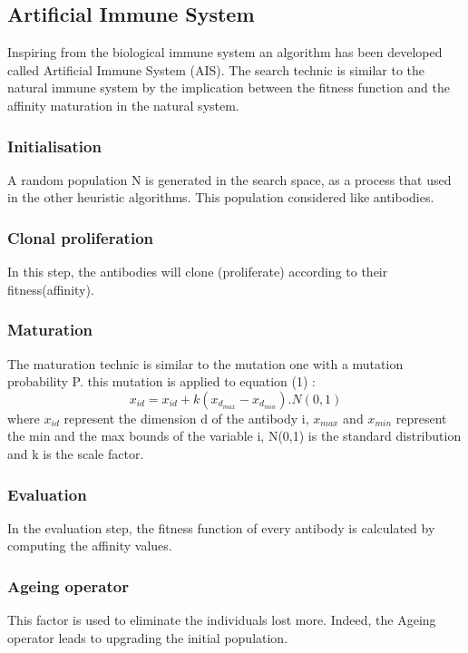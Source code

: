 \documentclass[conference]{IEEEtran}
\begin{document}
\subsection{Artificial Immune System}
Inspiring from the biological immune system an algorithm has been developed called Artificial Immune System (AIS)\cite{doc6}. The search technic is similar to the natural immune system by the implication between the fitness function and the affinity maturation in the natural system.
\subsubsection{Initialisation}
A random population N is generated in the search space, as a process that used in the other heuristic algorithms. This population considered like antibodies.
\subsubsection{Clonal proliferation}
In this step, the antibodies will clone (proliferate) according to their fitness(affinity).
\subsubsection{Maturation}
The maturation technic is similar to the mutation one with a mutation probability P. this mutation is applied to equation (1) : 
\begin{equation}
x_{id} = x_{id} + k(x_{d_{max}} - x_{d_{min}}) . N(0,1)
\end{equation}
where $x_{id}$ represent the dimension d of the antibody i, $x_{max}$ and $x_{min}$ represent the min and the max bounds of the variable i, N(0,1) is the standard distribution and k is the scale factor.
\subsubsection{Evaluation}
In the evaluation step, the fitness function of every antibody is calculated by computing the affinity values.
\subsubsection{Ageing operator}
This factor is used to eliminate the individuals lost more. Indeed, the Ageing operator leads to upgrading the initial population.
\end{document}
